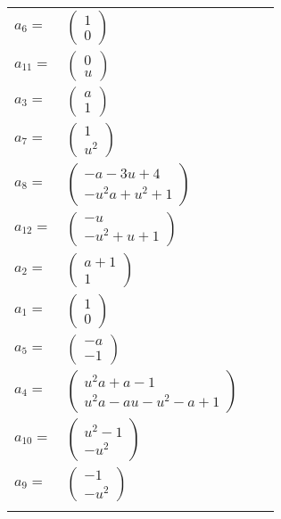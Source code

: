 \documentclass[1p]{elsarticle_modified}
\theoremstyle{definition}
\begin{document}
\begin{tabular}{m{7pt} m{180pt} m{7pt} m{180pt} }
\flushright $a_{6}=$&$\begin{pmatrix}1\\0\end{pmatrix}$ \\
\flushright $a_{11}=$&$\begin{pmatrix}0\\u\end{pmatrix}$ \\
\flushright $a_{3}=$&$\begin{pmatrix}a\\1\end{pmatrix}$ \\
\flushright $a_{7}=$&$\begin{pmatrix}1\\u^2\end{pmatrix}$ \\
\flushright $a_{8}=$&$\begin{pmatrix}- a-3 u+4\\- u^2 a+u^2+1\end{pmatrix}$ \\
\flushright $a_{12}=$&$\begin{pmatrix}- u\\- u^2+u+1\end{pmatrix}$ \\
\flushright $a_{2}=$&$\begin{pmatrix}a+1\\1\end{pmatrix}$ \\
\flushright $a_{1}=$&$\begin{pmatrix}1\\0\end{pmatrix}$ \\
\flushright $a_{5}=$&$\begin{pmatrix}- a\\-1\end{pmatrix}$ \\
\flushright $a_{4}=$&$\begin{pmatrix}u^2 a+a-1\\u^2 a- a u- u^2- a+1\end{pmatrix}$ \\
\flushright $a_{10}=$&$\begin{pmatrix}u^2-1\\- u^2\end{pmatrix}$ \\
\flushright $a_{9}=$&$\begin{pmatrix}-1\\- u^2\end{pmatrix}$\\&\end{tabular}
\end{document}
